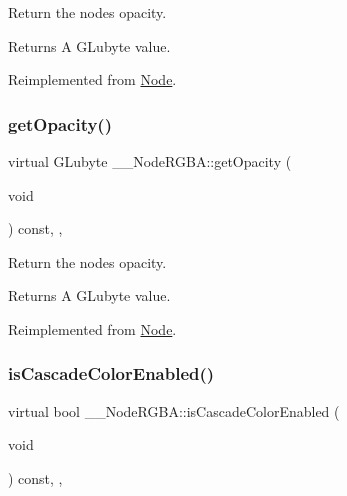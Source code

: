 Return the node\textquotesingle{}s opacity. \begin{DoxyReturn}{Returns}
A G\+Lubyte value. 
\end{DoxyReturn}


Reimplemented from \hyperlink{classNode_ab999cce3763ea09e74014245c770ea97}{Node}.

\mbox{\label{class____NodeRGBA_a48a5a78aea7c307ccfbe8c10e053b7c8}} 
\subsubsection{\texorpdfstring{get\+Opacity()}{getOpacity()}\hspace{0.1cm}{\footnotesize\ttfamily [2/2]}}
{\footnotesize\ttfamily virtual G\+Lubyte \+\_\+\+\_\+\+Node\+R\+G\+B\+A\+::get\+Opacity (\begin{DoxyParamCaption}\item[{void}]{ }\end{DoxyParamCaption}) const\hspace{0.3cm}{\ttfamily [inline]}, {\ttfamily [override]}, {\ttfamily [virtual]}}

Return the node\textquotesingle{}s opacity. \begin{DoxyReturn}{Returns}
A G\+Lubyte value. 
\end{DoxyReturn}


Reimplemented from \hyperlink{classNode_ab999cce3763ea09e74014245c770ea97}{Node}.

\mbox{\label{class____NodeRGBA_a24f2ae00f1994d6601ce8e1f089dafe1}} 
\subsubsection{\texorpdfstring{is\+Cascade\+Color\+Enabled()}{isCascadeColorEnabled()}\hspace{0.1cm}{\footnotesize\ttfamily [1/2]}}
{\footnotesize\ttfamily virtual bool \+\_\+\+\_\+\+Node\+R\+G\+B\+A\+::is\+Cascade\+Color\+Enabled (\begin{DoxyParamCaption}\item[{void}]{ }\end{DoxyParamCaption}) const\hspace{0.3cm}{\ttfamily [inline]}, {\ttfamily [override]}, {\ttfamily [virtual]}}

